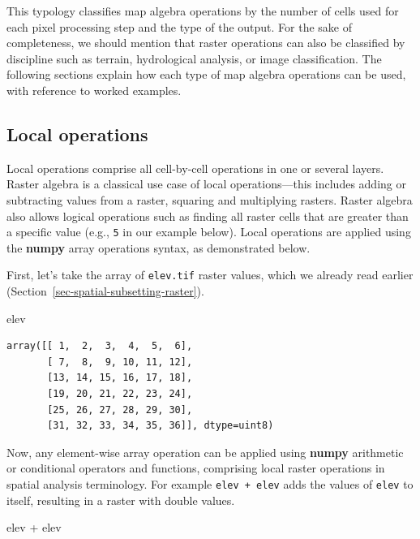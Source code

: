\documentclass[
  letterpaper,
]{krantz}
\newenvironment{Shaded}{\begin{snugshade}}{\end{snugshade}}
\newcommand{\NormalTok}[1]{\textcolor[rgb]{0.00,0.23,0.31}{#1}}
\newcommand{\OperatorTok}[1]{\textcolor[rgb]{0.37,0.37,0.37}{#1}}
\begin{document}
This typology classifies map algebra operations by the number of cells
used for each pixel processing step and the type of the output. For the
sake of completeness, we should mention that raster operations can also
be classified by discipline such as terrain, hydrological analysis, or
image classification. The following sections explain how each type of
map algebra operations can be used, with reference to worked examples.

\subsection{Local operations}\label{sec-raster-local-operations}

Local operations comprise all cell-by-cell operations in one or several
layers. Raster algebra is a classical use case of local
operations---this includes adding or subtracting values from a raster,
squaring and multiplying rasters. Raster algebra also allows logical
operations such as finding all raster cells that are greater than a
specific value (e.g., \texttt{5} in our example below). Local operations
are applied using the \textbf{numpy} array operations syntax, as
demonstrated below.

First, let's take the array of \texttt{elev.tif} raster values, which we
already read earlier (Section~\ref{sec-spatial-subsetting-raster}).

\begin{Shaded}
\begin{Highlighting}[]
\NormalTok{elev}
\end{Highlighting}
\end{Shaded}

\begin{verbatim}
array([[ 1,  2,  3,  4,  5,  6],
       [ 7,  8,  9, 10, 11, 12],
       [13, 14, 15, 16, 17, 18],
       [19, 20, 21, 22, 23, 24],
       [25, 26, 27, 28, 29, 30],
       [31, 32, 33, 34, 35, 36]], dtype=uint8)
\end{verbatim}

Now, any element-wise array operation can be applied using
\textbf{numpy} arithmetic or conditional operators and functions,
comprising local raster operations in spatial analysis terminology. For
example \texttt{elev\ +\ elev} adds the values of \texttt{elev} to
itself, resulting in a raster with double values.

\begin{Shaded}
\begin{Highlighting}[]
\NormalTok{elev }\OperatorTok{+}\NormalTok{ elev}
\end{Highlighting}
\end{Shaded}
\end{document}
